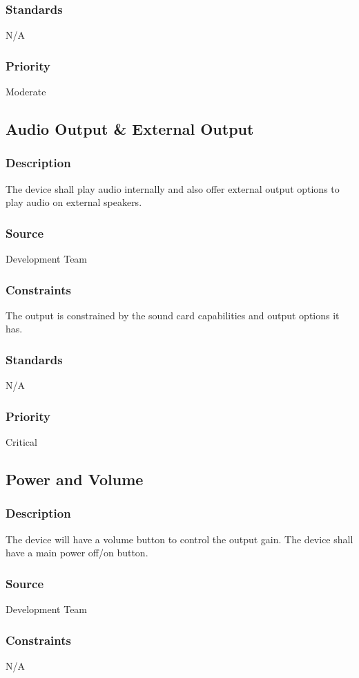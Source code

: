 \subsubsection{Standards}
N/A
\subsubsection{Priority}
Moderate

\subsection{Audio Output & External Output}
\subsubsection{Description}
The device shall play audio internally and also offer external output options to play audio on external speakers.
\subsubsection{Source}
Development Team
\subsubsection{Constraints}
The output is constrained by the sound card capabilities and output options it has.
\subsubsection{Standards}
N/A
\subsubsection{Priority}
Critical

\subsection{Power and Volume}
\subsubsection{Description}
The device will have a volume button to control the output gain. The device shall have a main power off/on button.
\subsubsection{Source}
Development Team
\subsubsection{Constraints}
N/A
